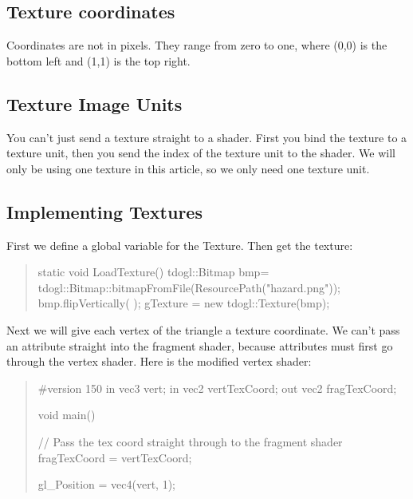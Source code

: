 \documentclass{article}
\begin{document}
\subsection{Texture coordinates}
Coordinates are not in pixels. They range from zero to one, where (0,0) is the bottom left and (1,1) is the top right.
\subsection{Texture Image Units}
You can't just send a texture straight to a shader. First you bind the texture to a texture unit, then you send the index of the texture unit to the shader. We will only be using one texture in this article, so we only need one texture unit. 
\subsection{Implementing Textures}
First we define a global variable for the Texture. Then get the texture:\\
\begin{quote}
static void LoadTexture() {
    tdogl::Bitmap bmp= tdogl::Bitmap::bitmapFromFile(ResourcePath("hazard.png"));
    bmp.flipVertically(	);
    gTexture = new tdogl::Texture(bmp);
}	
\end{quote}
Next we will give each vertex of the triangle a texture coordinate. We can’t pass an attribute straight into the fragment shader, because attributes must first go through the vertex shader. Here is the modified vertex shader:\\
\begin{quote}
#version 150
in vec3 vert;
in vec2 vertTexCoord;
out vec2 fragTexCoord;

void main() {
    // Pass the tex coord straight through to the fragment shader
    fragTexCoord = vertTexCoord;
    
    gl_Position = vec4(vert, 1);
}
\end{quote}
\end{document}
